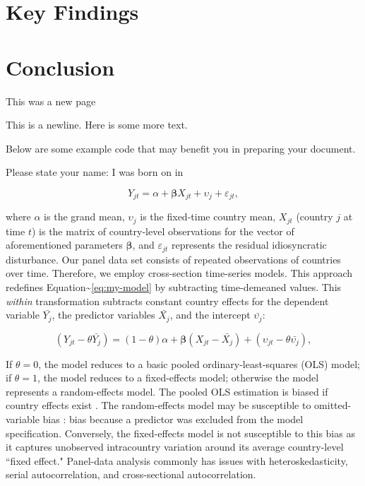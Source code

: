 \documentclass[]{article}
\begin{document}
\section{Key Findings}
\label{sec:findings}

\section{Conclusion}
\label{sec:conclusion}

\newpage

This was a new page

This is a newline. \newline  Here is some more text.

Below are some example code that may benefit you in preparing your
document. \newline

\vspace{0.25in}

\noindent Please state your name: \hrulefill \newline I was born on
\hrulefill in \hrulefill \vspace{0.25in}

\begin{equation}
\label{eq:my-model}
    Y_{jt} = \alpha + \bm{\beta}X_{jt} + \upsilon_{j}  + \varepsilon_{jt} ,
\end{equation}

\noindent where \(\alpha\) is the grand mean, \(\upsilon_{j}\) is the
fixed-time country mean, \(X_{jt}\) (country \(j\) at time \(t\)) is the
matrix of country-level observations for the vector of aforementioned
parameters \(\bm{\beta}\), and \(\varepsilon_{jt}\) represents the
residual idiosyncratic disturbance. Our panel data set consists of
repeated observations of countries over time. Therefore, we employ
cross-section time-series models. This approach redefines
Equation\textasciitilde{}\ref{eq:my-model} by subtracting time-demeaned
values. This \emph{within} transformation subtracts constant country
effects for the dependent variable \(\bar{Y_{j}}\), the predictor
variables \(\bar{X_{j}}\), and the intercept \(\bar{\upsilon_{j}}\):

\begin{equation}
\label{eq:my-random}
    (Y_{jt} - \theta \bar{Y_{j}}) = (1-\theta)\alpha + \bm{\beta}(X_{jt} - \bar{X_{j}}) +  (\upsilon_{jt} - \theta \bar{\upsilon_{j}})  ,
\end{equation}

\noindent If \(\theta = 0\), the model reduces to a basic pooled
ordinary-least-squares (OLS) model; if \(\theta = 1\), the model reduces
to a fixed-effects model; otherwise the model represents a
random-effects model. The pooled OLS estimation is biased if country
effects exist \citep{Hsiao:2003}. The random-effects model may be
susceptible to omitted-variable bias \citep{Wooldridge:2006}: bias
because a predictor was excluded from the model specification.
Conversely, the fixed-effects model is not susceptible to this bias as
it captures unobserved intracountry variation around its average
country-level ``fixed effect." Panel-data analysis commonly has issues
with heteroskedasticity, serial autocorrelation, and cross-sectional
autocorrelation.
\end{document}
